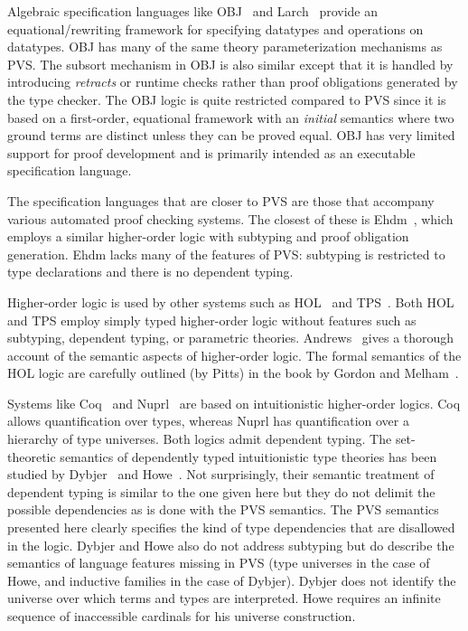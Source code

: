 \documentclass [12pt,twoside]{cslreport}
\begin{document}
Algebraic specification languages like OBJ~\cite{popl85} and
Larch~\cite{Larch:book} provide an 
equational/rewriting framework for specifying datatypes and operations on
datatypes.   OBJ has many of the same theory parameterization mechanisms
as PVS.  The subsort mechanism in OBJ is also similar except that
it is handled by introducing {\em retracts\/} or runtime checks
rather than proof obligations generated by the type checker.
The OBJ logic is quite restricted compared to PVS since it is based
on a first-order, equational framework with an {\em initial\/} semantics
where two ground terms are distinct unless they can be proved equal.
OBJ has very limited support for proof development and is primarily
intended as an executable specification language.

The specification languages that are closer to PVS are those that
accompany various automated proof checking systems.  The closest of these
is {\sc Ehdm}~\cite{EHDM:manuals}, which employs a similar higher-order
logic with subtyping and proof obligation generation.  {\sc Ehdm} lacks
many of the features of PVS: subtyping is restricted to type declarations
and there is no dependent typing.

Higher-order logic is used by other systems such as
HOL~\cite{Gordon&Melham:HOL} and TPS~\cite{andrews84}.
Both HOL and TPS employ simply typed higher-order logic 
without features such as subtyping, dependent typing, or parametric
theories.  
Andrews~\cite{Andrews:book} gives a thorough account of the semantic
aspects of higher-order logic.  The formal semantics of the HOL logic are
carefully outlined (by Pitts) in the book by Gordon and
Melham~\cite{Gordon&Melham:HOL}.

Systems like Coq~\cite{COQ} and Nuprl~\cite{Nuprl-book} are based on
intuitionistic higher-order logics.  Coq allows quantification over types,
whereas Nuprl has quantification over a hierarchy of type universes.  Both
logics admit dependent typing.  The set-theoretic semantics of dependently
typed intuitionistic type theories has been studied by
Dybjer~\cite{DybjerP:indsfm} and Howe~\cite{Howe91,Howe96}.  Not
surprisingly, their semantic treatment of dependent typing is similar to
the one given here but they do not delimit the possible dependencies as is
done with the PVS semantics.  The PVS semantics presented here clearly
specifies the kind of type dependencies that are disallowed in the logic.
Dybjer and Howe also do not address subtyping but do describe the
semantics of language features missing in PVS (type universes in the case
of Howe, and inductive families in the case of Dybjer).  Dybjer does not
identify the universe over which terms and types are interpreted.  Howe
requires an infinite sequence of inaccessible cardinals for his universe
construction.
\end{document}

